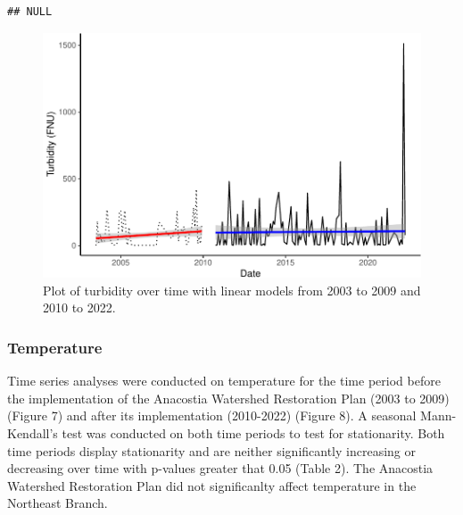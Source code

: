 \documentclass[
  12pt,
]{article}
\begin{document}
\begin{verbatim}
## NULL
\end{verbatim}

\newpage

\begin{figure}

{\centering \includegraphics{Fischer_WDA_FinalProject_files/figure-latex/Plot of Turbidity over time with LMs-1} 

}

\caption{Plot of turbidity over time with linear models from 2003 to 2009 and 2010 to 2022.}\label{fig:Plot of Turbidity over time with LMs}
\end{figure}

\newpage

\hypertarget{temperature}{%
\subsubsection{Temperature}\label{temperature}}

Time series analyses were conducted on temperature for the time period
before the implementation of the Anacostia Watershed Restoration Plan
(2003 to 2009) (Figure 7) and after its implementation (2010-2022)
(Figure 8). A seasonal Mann-Kendall's test was conducted on both time
periods to test for stationarity. Both time periods display stationarity
and are neither significantly increasing or decreasing over time with
p-values greater that 0.05 (Table 2). The Anacostia Watershed
Restoration Plan did not significanlty affect temperature in the
Northeast Branch.
\end{document}
